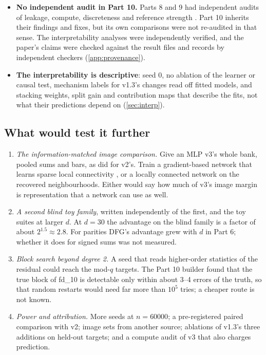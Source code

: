\begin{itemize}
\item \textbf{No independent audit in Part 10.} Parts 8 and 9 had independent audits of leakage, compute, discreteness and reference strength \cite{discretelearners2026}. Part 10 inherits their findings and fixes, but its own comparisons were not re-audited in that sense. The interpretability analyses were independently verified, and the paper's claims were checked against the result files and records by independent checkers (\cref{app:provenance}).
\item \textbf{The interpretability is descriptive}: seed 0, no ablation of the learner or causal test, mechanism labels for v1.3's changes read off fitted models, and stacking weights, split gain and contribution maps that describe the fits, not what their predictions depend on (\cref{sec:interp}).
\end{itemize}

\subsection{What would test it further}\label{sec:disc-next}

\begin{enumerate}
\item \emph{The information-matched image comparison.} Give an MLP v3's whole bank, pooled sums and bars, as  did for v2's. Train a gradient-based network that learns sparse local connectivity \cite{neyshabur2020convolutions}, or a locally connected network on the recovered neighbourhoods. Either would say how much of v3's image margin is representation that a network can use as well.
\item \emph{A second blind toy family}, written independently of the first, and the toy suites at larger $d$. At $d=30$ the advantage on the blind family is a factor of about $2^{1.5}\approx2.8$. For parities DFG's advantage grew with $d$ in Part 6; whether it does for signed sums was not measured.
\item \emph{Block search beyond degree 2.} A seed that reads higher-order statistics of the residual could reach the mod-$q$ targets. The Part 10 builder found that the true block of fd\_10 is detectable only within about 3--4 errors of the truth, so that random restarts would need far more than $10^5$ tries; a cheaper route is not known.
\item \emph{Power and attribution.} More seeds at $n=60000$; a pre-registered paired comparison with v2; image sets from another source; ablations of v1.3's three additions on held-out targets; and a compute audit of v3 that also charges prediction.
\end{enumerate}
